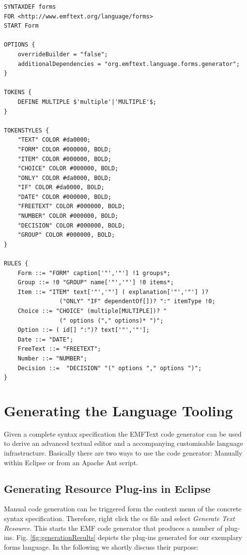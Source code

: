  
	\begin{lstlisting}[label=lst:formsCs, caption=Concrete syntax specification for
	the exemplary forms language written in the cs-language] 
SYNTAXDEF forms
FOR <http://www.emftext.org/language/forms>
START Form

OPTIONS {
	overrideBuilder = "false";
	additionalDependencies = "org.emftext.language.forms.generator";
}

TOKENS {
	DEFINE MULTIPLE $'multiple'|'MULTIPLE'$;
}

TOKENSTYLES {
	"TEXT" COLOR #da0000;
	"FORM" COLOR #000000, BOLD;
	"ITEM" COLOR #000000, BOLD;
	"CHOICE" COLOR #000000, BOLD;
	"ONLY" COLOR #da0000, BOLD;
	"IF" COLOR #da0000, BOLD;
	"DATE" COLOR #000000, BOLD;
	"FREETEXT" COLOR #000000, BOLD;
	"NUMBER" COLOR #000000, BOLD;
	"DECISION" COLOR #000000, BOLD;
	"GROUP" COLOR #000000, BOLD;
}
  
RULES {
	Form ::= "FORM" caption['"','"'] !1 groups*;
	Group ::= !0 "GROUP" name['"','"'] !0 items*;
	Item ::= "ITEM" text['"','"'] ( explanation['"','"'] )? 
				("ONLY" "IF" dependentOf[])? ":" itemType !0;
	Choice ::= "CHOICE" (multiple[MULTIPLE])? "
				(" options ("," options)* ")";
	Option ::= ( id[] ":")? text['"','"'];
	Date ::= "DATE";
	FreeText ::= "FREETEXT";
	Number ::= "NUMBER";
	Decision ::=  "DECISION" "(" options "," options ")"; 
}

	\end{lstlisting} 
 


\section{Generating the Language Tooling}
\label{sec:process_generating}
	Given a complete syntax specification the EMFText code generator can be used to
	derive an advanced textual editor and a accompanying customisable
	language infrastructure. Basically there are two ways to use the code
	generator: Manually within Eclipse or from an Apache Ant script.


	\subsection{Generating Resource Plug-ins in Eclipse}
	Manual code generation can be triggered form the context menu of the concrete
	syntax specification. Therefore, right click the cs file and select
	\emph{Generate Text Resource}. This starts the EMF code generator that produces
	a number of plug-ins. Fig. \ref{fig:generationResults} depicts the plug-ins
	generated for our exemplary forms language. In the following we shortly discuss
	their purpose:
	
